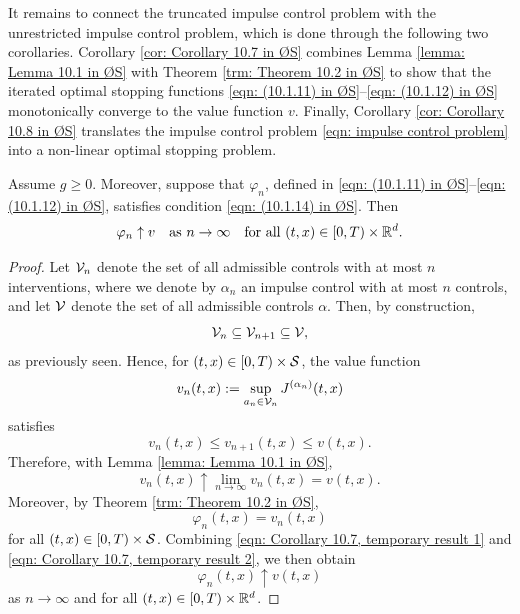 It remains to connect the truncated impulse control problem with the unrestricted impulse control problem, which is done through the following two corollaries. Corollary \ref{cor: Corollary 10.7 in ØS} combines Lemma \ref{lemma: Lemma 10.1 in ØS} with Theorem \ref{trm: Theorem 10.2 in ØS} to show that the iterated optimal stopping functions \eqref{eqn: (10.1.11) in ØS}--\eqref{eqn: (10.1.12) in ØS} monotonically converge to the value function $v$. Finally, Corollary \ref{cor: Corollary 10.8 in ØS} translates the impulse control problem \eqref{eqn: impulse control problem} into a non-linear optimal stopping problem.
\begin{corollary}
\label{cor: Corollary 10.7 in ØS}
    Assume $g\geq 0$. Moreover, suppose that $\varphi_n$, defined in \eqref{eqn: (10.1.11) in ØS}--\eqref{eqn: (10.1.12) in ØS}, satisfies condition \eqref{eqn: (10.1.14) in ØS}. Then
    \begin{equation*}
        \varphi_n \uparrow v \quad \text{as } n \rightarrow \infty \quad \text{for all } (t,x) \in [0,T) \times \mathbb{R}^d. 
    \end{equation*}
\end{corollary}
\begin{proof}
    Let $\mathcal{V}_n$ denote the set of all admissible controls with at most $n$ interventions, where we denote by $\alpha_n$ an impulse control with at most $n$ controls, and let $\mathcal{V}$ denote the set of all admissible controls $\alpha$. Then, by construction,
    \begin{equation*}
        \mathcal{V}_n \subseteq \mathcal{V}_{n+1} \subseteq \mathcal{V},
    \end{equation*}
    as previously seen. Hence, for $(t,x) \in [0,T) \times \mathcal{S}$, the value function
    \begin{equation*}
        v_n(t,x) := \sup_{a_n \in \mathcal{V}_n} J^{(\alpha_n)}(t,x)
    \end{equation*}
    satisfies
    \begin{equation*}
        v_n(t,x) \leq v_{n+1}(t,x) \leq v(t,x).
    \end{equation*}
    Therefore, with Lemma \ref{lemma: Lemma 10.1 in ØS}, 
    \begin{equation}
        v_n(t,x) \uparrow \lim_{n \rightarrow \infty} v_n(t,x) = v(t,x).
        \label{eqn: Corollary 10.7, temporary result 1}
    \end{equation}
    Moreover, by Theorem \ref{trm: Theorem 10.2 in ØS}, 
    \begin{equation}
        \varphi_n(t,x) = v_n(t,x)
        \label{eqn: Corollary 10.7, temporary result 2}
    \end{equation}
    for all $(t,x) \in [0,T) \times \mathcal{S}$. Combining \eqref{eqn: Corollary 10.7, temporary result 1} and \eqref{eqn: Corollary 10.7, temporary result 2}, we then obtain
    \begin{equation*}
        \varphi_n(t,x) \uparrow v(t,x)
    \end{equation*}
    as $n \rightarrow \infty$ and for all $(t,x) \in [0,T) \times \mathbb{R}^d$.
\end{proof}
